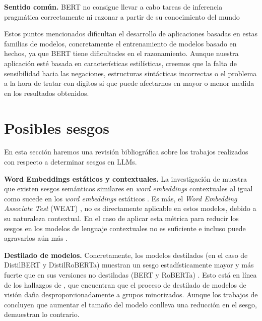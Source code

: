 \textbf{Sentido común.} BERT no consigue llevar a cabo tareas de inferencia pragmática correctamente \citep{Ettinger2019} ni razonar a partir de su conocimiento del mundo \citep{Forbes2019, Zhou2019, Richardson2019}

Estos puntos mencionados dificultan el desarrollo de aplicaciones basadas en estas familias de modelos, concretamente el entrenamiento de modelos basado en hechos, ya que BERT tiene dificultades en el razonamiento. Aunque nuestra aplicación esté basada en características estilísticas, creemos que la falta de sensibilidad hacia las negaciones, estructuras sintácticas incorrectas o el problema a la hora de tratar con dígitos si que puede afectarnos en mayor o menor medida en los resultados obtenidos.


\section{Posibles sesgos}
\label{sec:biases}

En esta sección haremos una revisión bibliográfica sobre los trabajos realizados con respecto a determinar sesgos en LLMs.

\textbf{Word Embeddings estáticos y contextuales.} La investigación de \citet{Kurita2019} muestra que existen sesgos semánticos similares en \textit{word embeddings} contextuales al igual como sucede en los \textit{word embeddings} estáticos \citep{Caliskan2017}. Es más, el \textit{Word Embedding Associate Test} (WEAT) \citep{Caliskan2017}, no es directamente aplicable en estos modelos, debido a su naturaleza contextual. En el caso de aplicar esta métrica para reducir los sesgos en los modelos de lenguaje contextuales no es suficiente e incluso puede agravarlos aún más \citep{Silva2021}.


\textbf{Destilado de modelos.} Concretamente, los modelos destilados (en el caso de DistilBERT y DistilRoBERTa) muestran un sesgo estadísticamente mayor y más fuerte que en sus versiones no destiladas (BERT y RoBERTa) \citep{Silva2021}. Esto está en línea de los hallazgos de \citet{Hooker2020}, que encuentran que el proceso de destilado de modelos de visión daña desproporcionadamente a grupos minorizados. Aunque los trabajos de \citet{Gilburt2019,TanCelis2019} concluyen que aumentar el tamaño del modelo conlleva una reducción en el sesgo, \citet{Silva2021,Nadeem2021} demuestran lo contrario.

